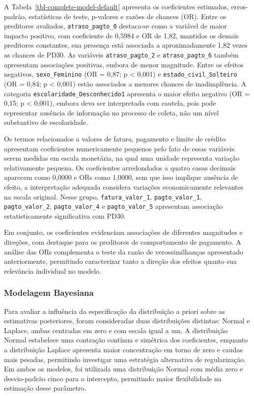 \documentclass[
  brazilian,
  12pt,
  letterpaper,
  DIV=11,
  numbers=noendperiod]{scrartcl}
\begin{document}
{\begin{longtable}[]
\end{longtable}

}

A Tabela~\ref{tbl-complete-model-default} apresenta os coeficientes
estimados, erros-padrão, estatísticas de teste, p-valores e razões de
chances (OR). Entre os preditores avaliados, \texttt{atraso\_pagto\_0}
destaca-se como a variável de maior impacto positivo, com coeficiente de
0,5984 e OR de 1,82, mantidos os demais preditores constantes, sua
presença está associada a aproximadamente 1,82 vezes as chances de PD30.
As variáveis \texttt{atraso\_pagto\_2} e \texttt{atraso\_pagto\_6}
também apresentam associações positivas, embora de menor magnitude.
Entre os efeitos negativos, \texttt{sexo\_Feminino} (OR = 0,87; p
\textless{} 0,001) e \texttt{estado\_civil\_Solteiro} (OR = 0,84; p
\textless{} 0,001) estão associados a menores chances de inadimplência.
A categoria \texttt{escolaridade\_Desconhecido1} apresenta o maior
efeito negativo (OR = 0,15; p \textless{} 0,001), embora deva ser
interpretada com cautela, pois pode representar ausência de informação
no processo de coleta, não um nível substantivo de escolaridade.

Os termos relacionados a valores de fatura, pagamento e limite de
crédito apresentam coeficientes numericamente pequenos pelo fato de
essas variáveis serem medidas em escala monetária, na qual uma unidade
representa variação relativamente pequena. Os coeficientes arredondados
a quatro casas decimais aparecem como 0,0000 e ORs como 1,0000, sem que
isso implique ausência de efeito, a interpretação adequada considera
variações economicamente relevantes na escala original. Nesse grupo,
\texttt{fatura\_valor\_1}, \texttt{pagto\_valor\_1},
\texttt{pagto\_valor\_2}, \texttt{pagto\_valor\_4} e
\texttt{pagto\_valor\_5} apresentam associação estatisticamente
significativa com PD30.

Em conjunto, os coeficientes evidenciam associações de diferentes
magnitudes e direções, com destaque para os preditores de comportamento
de pagamento. A análise das ORs complementa o teste da razão de
verossimilhanças apresentado anteriormente, permitindo caracterizar
tanto a direção dos efeitos quanto sua relevância individual no modelo.

\subsubsection{Modelagem Bayesiana}\label{modelagem-bayesiana}

Para avaliar a influência da especificação da distribuição a priori
sobre as estimativas posteriores, foram consideradas duas distribuições
distintas: Normal e Laplace, ambas centradas em zero e com escala igual
a um. A distribuição Normal estabelece uma contração contínua e
simétrica dos coeficientes, enquanto a distribuição Laplace apresenta
maior concentração em torno de zero e caudas mais pesadas, permitindo
investigar uma estratégia alternativa de regularização. Em ambos os
modelos, foi utilizada uma distribuição Normal com média zero e
desvio-padrão cinco para o intercepto, permitindo maior flexibilidade na
estimação desse parâmetro.
\end{document}
